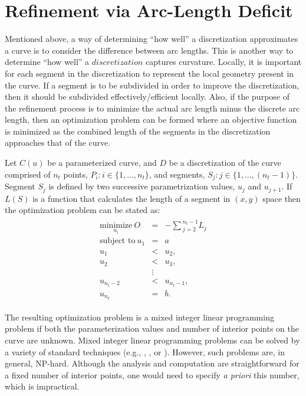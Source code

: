 \section{Refinement via Arc-Length Deficit}
Mentioned above, a way of determining ``how well'' a discretization 
approximates a curve is to consider the difference between arc lengths. 
This is another way to determine ``how well'' a $discretization$ captures curvature. Locally, it is important for each segment in the discretization to represent the local geometry present in the curve. If a segment is to be subdivided in order to improve the discretization, then it should be subdivided 
effectively/efficient locally.
Also, if the purpose of the refinement process is to minimize the actual 
arc length minus the discrete arc length, then an optimization problem can 
be formed where an objective function is minimized as the combined length of the segments in the discretization approaches that of the curve.

Let $C(u)$ be a parameterized curve, and $D$ be a discretization of the 
curve comprised of $n_t$ points, $P_i : i \in \{1,...,n_t\}$, and 
segments, $S_j : j \in \{1,...,(n_t-1)\}$. Segment $S_j$ is defined by two successive parametrization values, $u_j$ and $u_{j+1}$. If $L(S)$ is a function that calculates the length of a segment in $(x,y)$ space then the optimization problem can be stated as:
\begin{eqnarray*}
\begin{array}{rcl}
\underset{u_i}{\text{minimize}} \ O & = & -\sum{_{j=2}^{n_t-1}L_j} \\
\text{subject to} \ u_1 & = & a \\
u_1 & < & u_2, \\ 
u_2 & < & u_3, \\
& \vdots & \\
u_{n_t-2} & < & u_{n_t-1},\\ 
u_{n_t} & = & b.
\end{array}
\end{eqnarray*}

The resulting optimization problem is a mixed integer linear programming 
problem if both the parameterization values and number of interior points 
on the curve are unknown.  Mixed integer linear programming problems can 
be solved by a variety of standard techniques (e.g., \cite{minto}, 
\cite{mosek}, or \cite{symphony}).  However, such problems 
are, in general, NP-hard.  
Although the analysis and computation are straightforward for a fixed 
number of interior points, one would need to specify {\it{a priori}} this 
number, which is impractical.

